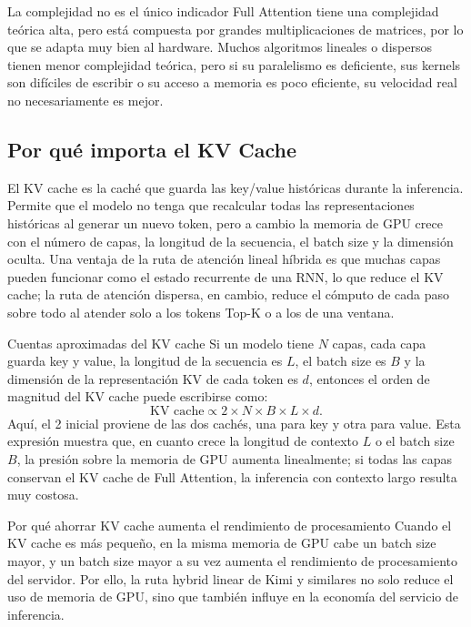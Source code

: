 \documentclass[a4paper]{article}
\begin{document}
\begin{warningbox}{La complejidad no es el único indicador}
Full Attention tiene una complejidad teórica alta, pero está compuesta por grandes multiplicaciones de matrices, por lo que se adapta muy bien al hardware. Muchos algoritmos lineales o dispersos tienen menor complejidad teórica, pero si su paralelismo es deficiente, sus kernels son difíciles de escribir o su acceso a memoria es poco eficiente, su velocidad real no necesariamente es mejor.
\end{warningbox}

\subsection{Por qué importa el KV Cache}

El KV cache es la caché que guarda las key/value históricas durante la inferencia. Permite que el modelo no tenga que recalcular todas las representaciones históricas al generar un nuevo token, pero a cambio la memoria de GPU crece con el número de capas, la longitud de la secuencia, el batch size y la dimensión oculta. Una ventaja de la ruta de atención lineal híbrida es que muchas capas pueden funcionar como el estado recurrente de una RNN, lo que reduce el KV cache; la ruta de atención dispersa, en cambio, reduce el cómputo de cada paso sobre todo al atender solo a los tokens Top-K o a los de una ventana.

\begin{knowledgebox}{Cuentas aproximadas del KV cache}
Si un modelo tiene \(N\) capas, cada capa guarda key y value, la longitud de la secuencia es \(L\), el batch size es \(B\) y la dimensión de la representación KV de cada token es \(d\), entonces el orden de magnitud del KV cache puede escribirse como:
\[
\text{KV cache} \propto 2 \times N \times B \times L \times d.
\]
Aquí, el 2 inicial proviene de las dos cachés, una para key y otra para value. Esta expresión muestra que, en cuanto crece la longitud de contexto \(L\) o el batch size \(B\), la presión sobre la memoria de GPU aumenta linealmente; si todas las capas conservan el KV cache de Full Attention, la inferencia con contexto largo resulta muy costosa.
\end{knowledgebox}

\begin{importantbox}{Por qué ahorrar KV cache aumenta el rendimiento de procesamiento}
Cuando el KV cache es más pequeño, en la misma memoria de GPU cabe un batch size mayor, y un batch size mayor a su vez aumenta el rendimiento de procesamiento del servidor. Por ello, la ruta hybrid linear de Kimi y similares no solo reduce el uso de memoria de GPU, sino que también influye en la economía del servicio de inferencia.
\end{importantbox}
\end{document}
